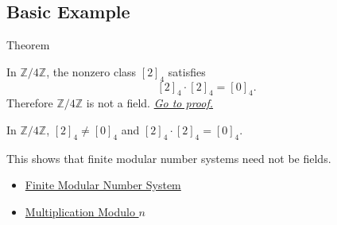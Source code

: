 \subsection*{Basic Example}

\begin{theorembox}{Theorem}
\begin{theorem}
\label{thm:z-mod-four-has-zero-divisors}
In \(\mathbb{Z}/4\mathbb{Z}\), the nonzero class \([2]_4\) satisfies
\[
[2]_4\cdot[2]_4=[0]_4.
\]
Therefore \(\mathbb{Z}/4\mathbb{Z}\) is not a field.
\hyperref[prf:z-mod-four-has-zero-divisors]{\textit{Go to proof.}}
\end{theorem}
\end{theorembox}

\begin{remark*}
In \(\mathbb{Z}/4\mathbb{Z}\), \([2]_4\neq[0]_4\) and
\([2]_4\cdot[2]_4=[0]_4\).
\end{remark*}

\begin{remark*}[Interpretation]
This shows that finite modular number systems need not be fields.
\end{remark*}

\begin{dependencies}
\begin{itemize}
  \item \hyperref[def:finite-modular-number-system]{Finite Modular Number System}
  \item \hyperref[def:multiplication-modulo-n]{Multiplication Modulo \(n\)}
\end{itemize}
\end{dependencies}
